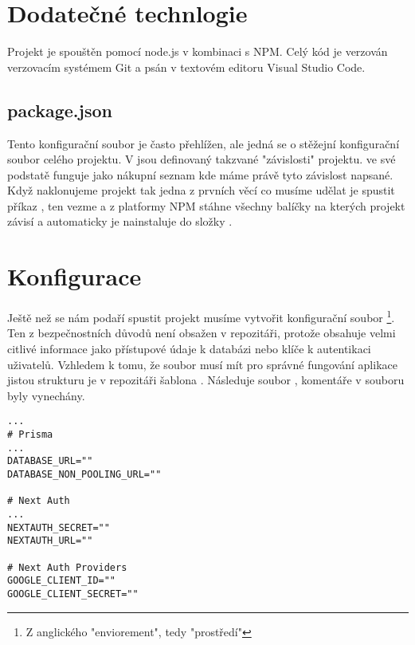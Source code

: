 \section{Dodatečné technlogie}
Projekt je spouštěn pomocí node.js v kombinaci s NPM. Celý kód je verzován verzovacím systémem Git a psán v textovém editoru Visual Studio Code.
\subsection{package.json}
Tento konfigurační soubor je často přehlížen, ale jedná se o stěžejní konfigurační soubor celého projektu. V  jsou definovaný takzvané "závislosti" projektu.  ve své podstatě funguje jako nákupní seznam kde máme právě tyto závislost napsané. Když naklonujeme projekt tak jedna z prvních věcí co musíme udělat je spustit příkaz , ten vezme  a z platformy NPM\cite{npm} stáhne všechny balíčky na kterých projekt závisí a automaticky je nainstaluje do složky .
\section{Konfigurace}
Ještě než se nám podaří spustit projekt musíme vytvořit konfigurační soubor \footnote{Z anglického "enviorement", tedy "prostředí"}. Ten z bezpečnostních důvodů není obsažen v repozitáři, protože obsahuje velmi citlivé informace jako přístupové údaje k databázi nebo klíče k autentikaci uživatelů. Vzhledem k tomu, že  soubor musí mít pro správné fungování aplikace jistou strukturu je v repozitáři šablona . Následuje soubor , komentáře v souboru byly vynechány.
\begin{lstlisting}[caption=Šablona konfiguračního souboru .env]
...
# Prisma
...
DATABASE_URL=""
DATABASE_NON_POOLING_URL=""

# Next Auth
...
NEXTAUTH_SECRET=""
NEXTAUTH_URL=""

# Next Auth Providers
GOOGLE_CLIENT_ID=""
GOOGLE_CLIENT_SECRET=""
\end{lstlisting}